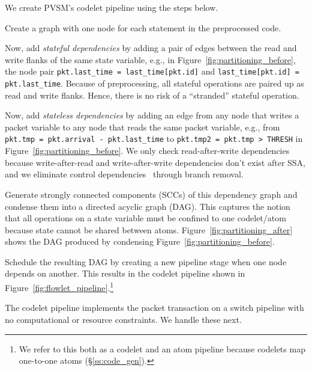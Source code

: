 We create PVSM's codelet pipeline using the steps below.
\begin{CompactEnumerate}
  \item Create a graph with one node for each statement in the preprocessed code.
  \item Now, add {\em stateful dependencies} by adding a pair of edges between
    the read and write flanks of the same state variable, e.g., in
    Figure~\ref{fig:partitioning_before}, the node pair {\tt pkt.last\_time =
    last\_time[pkt.id]} and {\tt last\_time[pkt.id] = pkt.last\_time}. Because of
    preprocessing, all stateful operations are paired up as read and write flanks.
    Hence, there is no risk of a ``stranded'' stateful operation.
  \item Now, add {\em stateless dependencies} by adding an edge from any node
    that writes a packet variable to any node that reads the same packet variable,
    e.g., from {\tt pkt.tmp = pkt.arrival - pkt.last\_time} to {\tt pkt.tmp2 =
    pkt.tmp > THRESH} in Figure~\ref{fig:partitioning_before}. We only check read-after-write dependencies because
    write-after-read and write-after-write dependencies don't exist after SSA, and
    we eliminate control dependencies~\cite{ssa} through branch removal.
  \item Generate strongly connected components (SCCs) of this dependency graph
    and condense them into a directed acyclic graph (DAG). This captures the notion that all
    operations on a state variable must be confined to one codelet/atom because
    state cannot be shared between atoms. Figure~\ref{fig:partitioning_after}
    shows the DAG produced by condensing Figure~\ref{fig:partitioning_before}.
  \item Schedule the resulting DAG by creating a new pipeline stage when one
    node depends on another. This results in the codelet pipeline
    shown in Figure~\ref{fig:flowlet_pipeline}.\footnote{We refer to this both
    as a codelet and an atom pipeline because codelets map one-to-one atoms
  (\S\ref{ss:code_gen}).}
\end{CompactEnumerate}
The codelet pipeline implements the packet transaction on a switch pipeline
with no computational or resource constraints. We handle these next.

